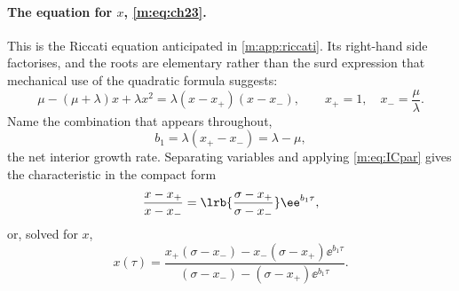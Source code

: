 \paragraph{The equation for $x$, \eqref{m:eq:ch23}.}
This is the Riccati equation anticipated in \cref{m:app:riccati}. Its right-hand
side factorises, and the roots are elementary rather than the surd expression that
mechanical use of the quadratic formula suggests:
\begin{equation}
\label{m:eq:xpm}
\mu-(\mu+\lambda)x+\lambda x^2 = \lambda(x-x_+)(x-x_-),
\qquad
x_+ = 1,\quad x_- = \frac{\mu}{\lambda} .
\end{equation}
Name the combination that appears throughout,
\begin{equation}
\label{m:eq:b1}
b_1 = \lambda(x_+-x_-) = \lambda-\mu ,
\end{equation}
the net interior growth rate. Separating variables and applying \cref{m:eq:ICpar}
gives the characteristic in the compact form
\begin{equation}
\label{m:eq:xratio}
\frac{x-x_+}{x-x_-} = \lrb{\frac{\sigma-x_+}{\sigma-x_-}}\ee^{b_1\tau},
\end{equation}
or, solved for $x$,
\begin{equation}
\label{m:eq:xabd}
x(\tau) = \frac{x_+(\sigma-x_-) - x_-(\sigma-x_+)\ee^{b_1\tau}}
{(\sigma-x_-) - (\sigma-x_+)\ee^{b_1\tau}} .
\end{equation}

